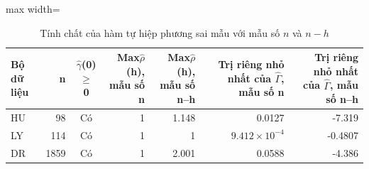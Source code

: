 \begin{table}[H]
\centering\small
\caption{Tính chất của hàm tự hiệp phương sai mẫu với mẫu số $n$ và $n-h$}\label{tab:tab_b11_02_gamma_properties}
\begin{adjustbox}{max width=\linewidth}
\begin{tabular}{lrcrrrr}
\toprule
Bộ dữ liệu & n & $\hat{\gamma}$(0) $\ge$ 0 & Max\textbar{}$\hat{\rho}$(h)\textbar{}, mẫu số n & Max\textbar{}$\hat{\rho}$(h)\textbar{}, mẫu số n–h & Trị riêng nhỏ nhất của $\hat{\Gamma}$, mẫu số n & Trị riêng nhỏ nhất của $\hat{\Gamma}$, mẫu số n–h \\
\midrule
HU & 98 & Có & 1 & 1.148 & 0.0127 & -7.319 \\
LY & 114 & Có & 1 & 1 & $9.412\times10^{-4}$ & -0.4807 \\
DR & 1859 & Có & 1 & 2.001 & 0.0588 & -4.386 \\
\bottomrule
\end{tabular}
\end{adjustbox}\par{}
\end{table}
